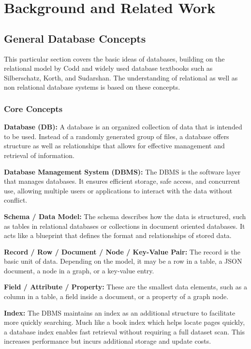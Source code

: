 \chapter{Background and Related Work}\label{chap:background}

\section{General Database Concepts}\label{sec:general-database-concepts}

This particular section covers the basic ideas of databases, building on the
relational model by Codd\cite{Codd1970} and widely used database textbooks such
as
Silberschatz, Korth, and Sudarshan\cite{Silberschatz2020}. The understanding of
relational as well as non relational database systems is based on these
concepts.

\subsection{Core Concepts} \textbf{Database (DB):} A database is an organized
collection of data that is intended  to be used. Instead of a randomly
generated group of files, a database offers structure as well as relationships
that allows for effective management and retrieval of
information\cite{Silberschatz2020}.

\textbf{Database Management System (DBMS):} The DBMS is the software layer that
manages databases. It ensures efficient storage, safe access, and concurrent
use, allowing multiple users or applications to interact with the data without
conflict\cite{Ramakrishnan2003}.

\textbf{Schema / Data Model:} The schema describes how the data is structured,
such as tables in relational databases or collections in document oriented
databases. It acts like a blueprint that defines the format and relationships
of stored data.

\textbf{Record / Row / Document / Node / Key-Value Pair:} The record is the
basic unit of data. Depending on the model, it may be a row in a table, a JSON
document, a node in a graph, or a key-value entry.

\textbf{Field / Attribute / Property:} These are the smallest data elements,
such as a column in a table, a field inside a document, or a property of a
graph node.

\textbf{Index:} The DBMS maintains an index as an additional structure to
facilitate more quickly searching. Much like a book index which helps locate
pages quickly, a database index enables fast retrieval without requiring a full
dataset scan. This increases performance but incurs additional storage and
update costs\cite{Selinger1979}.

